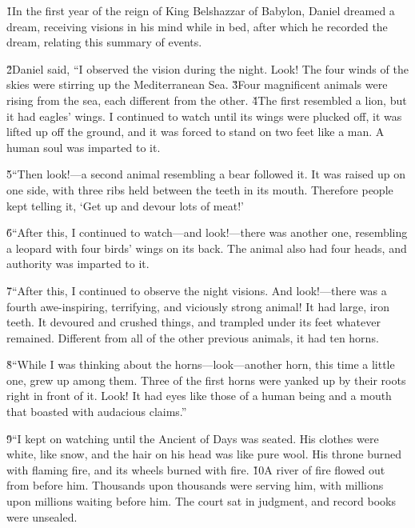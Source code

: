 \v{1}In the first year of the reign of King Belshazzar of Babylon, Daniel dreamed a dream, receiving visions in his mind while in bed, after which he recorded the dream, relating this summary of events.

\v{2}Daniel said, ``I observed the vision during the night. Look! The four winds of the skies were stirring up the Mediterranean Sea. \v{3}Four magnificent animals were rising from the sea, each different from the other. \v{4}The first resembled a lion, but it had eagles' wings. I continued to watch until its wings were plucked off, it was lifted up off the ground, and it was forced to stand on two feet like a man. A human soul was imparted to it.

\v{5}``Then look!---a second animal resembling a bear followed it. It was raised up on one side, with three ribs held between the teeth in its mouth. Therefore people kept telling it, `Get up and devour lots of meat!'

\v{6}``After this, I continued to watch---and look!---there was another one, resembling a leopard with four birds' wings on its back. The animal also had four heads, and authority was imparted to it.

\v{7}``After this, I continued to observe the night visions. And look!---there was a fourth awe-inspiring, terrifying, and viciously strong animal! It had large, iron teeth. It devoured and crushed things, and trampled under its feet whatever remained. Different from all of the other previous animals, it had ten horns.

\v{8}``While I was thinking about the horns---look---another horn, this time a little one, grew up among them. Three of the first horns were yanked up by their roots right in front of it. Look! It had eyes like those of a human being and a mouth that boasted with audacious claims.''

\v{9}``I kept on watching until the Ancient of Days was seated. His clothes were white, like snow, and the hair on his head was like pure wool. His throne burned with flaming fire, and its wheels burned with fire. \v{10}A river of fire flowed out from before him. Thousands upon thousands were serving him, with millions upon millions waiting before him. The court sat in judgment, and record books were unsealed.


